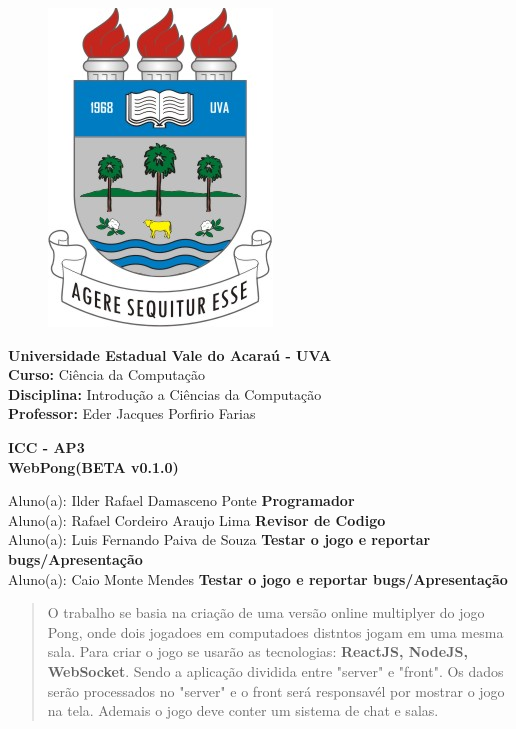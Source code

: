 \documentclass[12pt,openright,oneside,a4paper,brazil,article]{abntex2}
\begin{document}
  \textual
  \SingleSpacing

  \begin{figure}
    \includegraphics[scale=0.18]{uva.png}
  \end{figure}

  \noindent \textbf{Universidade Estadual Vale do Acaraú - UVA} \\
  \noindent \textbf{Curso:} Ciência da Computação \\
  \noindent \textbf{Disciplina:} Introdução a Ciências da Computação\\
  \noindent \textbf{Professor:} Eder Jacques Porfirio Farias \\

  \begin{center}
    \textbf{ICC - AP3} \\
    \textbf{WebPong(BETA v0.1.0)} 
  \end{center}


  \noindent Aluno(a): Ilder Rafael Damasceno Ponte \textbf{Programador} \\
  \noindent Aluno(a): Rafael Cordeiro Araujo Lima \textbf{Revisor de Codigo}\\
  \noindent Aluno(a): Luis Fernando Paiva de Souza \textbf{Testar o jogo e reportar bugs/Apresentação}\\
  \noindent Aluno(a): Caio Monte Mendes \textbf{Testar o jogo e reportar bugs/Apresentação}\\
  
  \begin{abstract}
  O trabalho se basia na criação de uma versão online multiplyer do jogo Pong,
  onde dois jogadoes em computadoes distntos jogam em uma mesma sala. Para criar 
  o jogo se usarão as tecnologias: \textbf{ReactJS, NodeJS, WebSocket}. Sendo a 
  aplicação dividida entre "server" e "front". Os dados serão processados no "server"
  e o front será responsavél por mostrar o jogo na tela. Ademais o jogo deve conter
  um sistema de chat e salas.
  \end{abstract}
  
\end{document}

